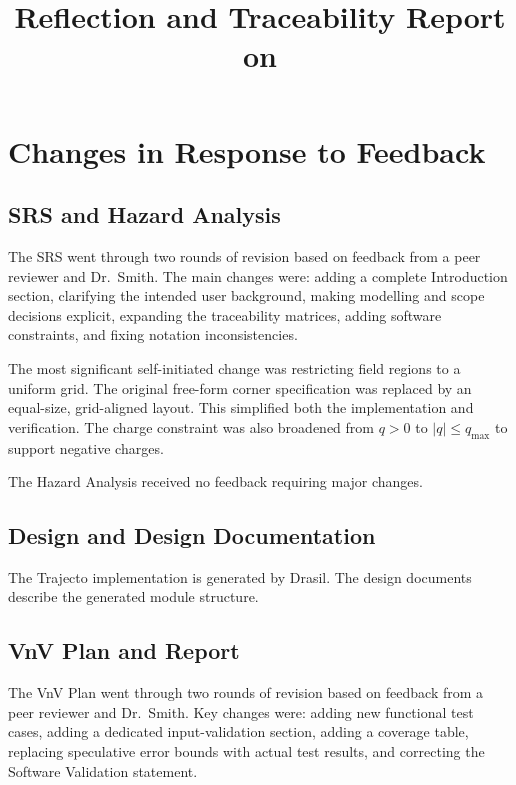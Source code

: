 \documentclass{article}
\title{Reflection and Traceability Report on \progname}
\author{\authname}
\date{}
\begin{document}
\maketitle

\section{Changes in Response to Feedback}

\subsection{SRS and Hazard Analysis}

The SRS went through two rounds of revision based on feedback from a
peer reviewer and Dr.\ Smith.
The main changes were: adding a complete Introduction section,
clarifying the intended user background, making modelling and scope
decisions explicit, expanding the traceability matrices, adding software
constraints, and fixing notation inconsistencies.

The most significant self-initiated change was restricting field regions
to a uniform grid.
The original free-form corner specification was replaced by an
equal-size, grid-aligned layout.
This simplified both the implementation and verification.
The charge constraint was also broadened from $q>0$ to
$|q|\le q_\text{max}$ to support negative charges.

The Hazard Analysis received no feedback requiring major changes.

\subsection{Design and Design Documentation}

The Trajecto implementation is generated by Drasil.
The design documents describe the generated module structure.

\subsection{VnV Plan and Report}

The VnV Plan went through two rounds of revision based on feedback from
a peer reviewer and Dr.\ Smith.
Key changes were: adding new functional test cases, adding a dedicated
input-validation section, adding a coverage table, replacing speculative
error bounds with actual test results, and correcting the Software
Validation statement.
\end{document}
